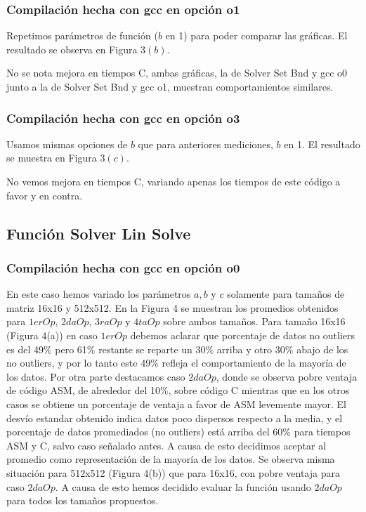 \subsubsection{Compilación hecha con gcc en opción o1}
Repetimos parámetros de función ($b$ en 1) para poder comparar las gráficas. El resultado se observa en Figura 3$(b)$.
 
No se nota mejora en tiempos C, ambas gráficas, la de Solver Set Bnd y gcc o0 junto a la de Solver Set Bnd y gcc o1, muestran comportamientos similares.

\subsubsection{Compilación hecha con gcc en opción o3}
Usamos mismas opciones de $b$ que para anteriores mediciones, $b$ en 1. El resultado se muestra en Figura 3$(c)$.
 
No vemos mejora en tiempos C, variando apenas los tiempos de este código a favor y en contra. 

\subsection{Función Solver Lin Solve}

\subsubsection{Compilación hecha con gcc en opción o0}
En este caso hemos variado los parámetros $a,b$ y $c$ solamente para tamaños de matriz 16x16 y 512x512. En la Figura 4 se muestran los promedios obtenidos para $1erOp$, $2daOp$, $3raOp$ y $4taOp$ sobre ambos tamaños. 
Para tamaño 16x16 (Figura 4(a)) en caso $1erOp$ debemos aclarar que porcentaje de datos no outliers es del 49$\%$ pero 61$\%$ restante se reparte un 30$\%$ arriba y otro 30$\%$ abajo de los no outliers, y por lo tanto este 49$\%$ refleja el comportamiento de la mayoría de los datos. Por otra parte destacamos caso $2daOp$, donde se observa pobre ventaja de código ASM, de alrededor del 10$\%$, sobre código C mientras que en los otros casos se obtiene un porcentaje de ventaja a favor de ASM levemente mayor. El desvío estandar obtenido indica datos poco dispersos respecto a la media, y el porcentaje de datos promediados (no outliers) está arriba del 60$\%$ para tiempos ASM y C, salvo caso señalado antes. A causa de esto decidimos aceptar al promedio como representación de la mayoría de los datos. Se observa misma situación para 512x512 (Figura 4(b)) que para 16x16, con pobre ventaja para caso $2daOp$. A causa de esto hemos decidido evaluar la función usando $2daOp$ para todos los tamaños propuestos.
 
